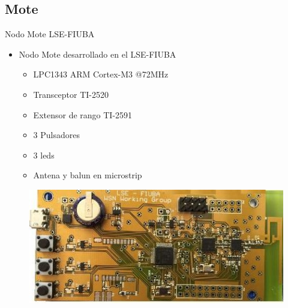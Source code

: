 \documentclass[aspectratio=169]{beamer}
\begin{document}
\subsection[Mote]{Mote}
\begin{frame}{Nodo Mote LSE-FIUBA} 

\begin{minipage}[c]{1.0\linewidth}
	\begin{minipage}[c]{0.6\linewidth}
		\begin{itemize}
			\item Nodo Mote desarrollado en el LSE-FIUBA
			\vspace{15px}
			\begin{itemize}
				\item LPC1343 ARM Cortex-M3 @72MHz
				\vspace{5px}
				\item Transceptor TI-2520
				\vspace{5px}
				\item Extensor de rango TI-2591
				\vspace{5px}
				\item 3 Pulsadores
				\vspace{5px}
				\item 3 leds
				\vspace{5px}
				\item Antena y balun en microstrip
			\end{itemize}
			\vspace{10px}
		\end{itemize}
	\end{minipage}
	\begin{minipage}[c]{0.35\linewidth}
		\begin{figure}[H]
			\vspace{35px}
			\includegraphics[width=1\textwidth]{./imagenes/mote.jpg}
			\\
			\vspace{10px}

\end{figure}
\end{minipage}
\end{minipage}
\end{frame}
\end{document}

